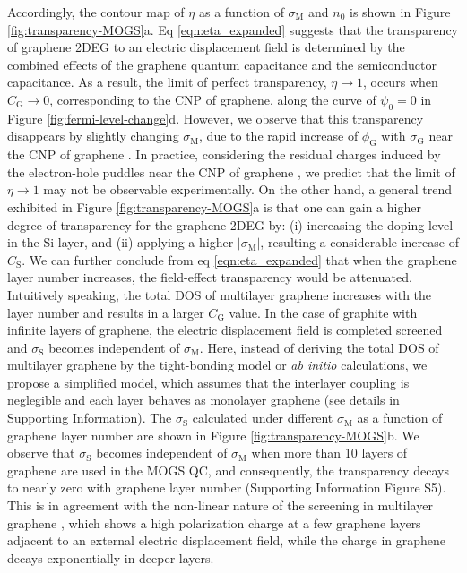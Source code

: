 \documentclass[journal=nalefd]{achemso}
\newcommand*\subs[1]{_{\text{#1}}} %
\newcommand*\change[1]{{#1}}
\begin{document}
Accordingly, the contour map of $\eta$ as a function of $\sigma\subs{M}$ and $n_0$ is shown in Figure \ref{fig:transparency-MOGS}a.
Eq \ref{eqn:eta_expanded} suggests that the transparency of graphene 2DEG to an electric displacement field is determined by the combined effects of the graphene quantum capacitance and the semiconductor capacitance.
As a result, the limit of perfect transparency, $\eta \to 1$, occurs when $C\subs{G} \to 0$, corresponding to the CNP of graphene, along the curve of $\psi_0=0$ in Figure \ref{fig:fermi-level-change}d. 
However, we observe that this transparency disappears by slightly changing $\sigma\subs{M}$, due to the rapid increase of  $\phi\subs{G}$ with $\sigma\subs{G}$ near the CNP of graphene \cite{Neto2009Electron}.
In practice, considering the residual charges induced by the electron-hole puddles near the CNP of graphene \cite{Sarma2011Electronic}, we predict that the limit of $\eta \to 1$ may not be observable experimentally.
On the other hand, a general trend exhibited in Figure \ref{fig:transparency-MOGS}a is that one can gain a higher degree of transparency for the graphene 2DEG by: (i) increasing the doping level in the Si layer, and (ii) applying a higher $|\sigma\subs{M}|$, resulting a considerable increase of $C\subs{S}$.
\change{
  We can further conclude from eq \ref{eqn:eta_expanded} that when the graphene layer number increases, the field-effect transparency would be attenuated. 
  Intuitively speaking, the total DOS of multilayer graphene increases with the layer number and results in a larger $C\subs{G}$ value. In the case of graphite with infinite layers of graphene, the electric displacement field is completed screened and $\sigma\subs{S}$ becomes independent of $\sigma\subs{M}$.
  Here, instead of deriving the total DOS of multilayer graphene by the tight-bonding model \cite{Nilsson2008} or \textit{ab initio} calculations, 
  we propose a simplified model, which assumes that the interlayer coupling is neglegible and each layer behaves as monolayer graphene (see details in Supporting Information).
  The $\sigma\subs{S}$ calculated under different $\sigma\subs{M}$ as a function of graphene layer number are shown in Figure \ref{fig:transparency-MOGS}b.
  We observe that $\sigma\subs{S}$ becomes independent of $\sigma\subs{M}$ when more than 10 layers of graphene are used in the MOGS QC, and consequently, the transparency decays to nearly zero with graphene layer number (Supporting Information Figure S5).
  This is in agreement with the non-linear nature of the screening in multilayer graphene \cite{Santos2013Graphene}, which shows a high polarization charge at a few graphene layers adjacent to an external electric displacement field, while the charge in graphene decays exponentially in deeper layers.  
}              
\end{document}
